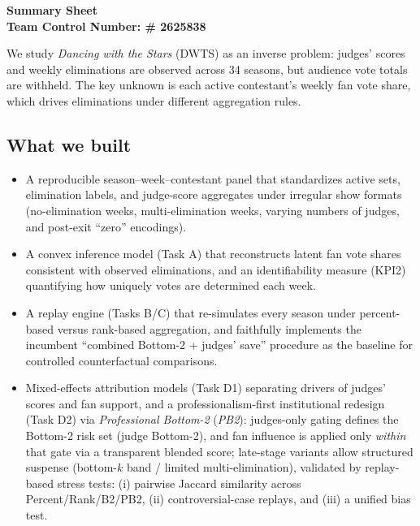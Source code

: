 \begin{center}
  \textbf{\LARGE Summary Sheet}\\[0.35em]
  \textbf{Team Control Number: \# 2625838}
\end{center}

\setlength{\parskip}{-0.5em}
\setlength{\parindent}{0pt}

\small
We study \emph{Dancing with the Stars} (DWTS) as an inverse problem: judges' scores and weekly eliminations are observed
across 34 seasons\cite{comap2026_problemC_data}, but audience vote totals are withheld. The key unknown is each active contestant's weekly fan vote share,
which drives eliminations under different aggregation rules.

\subsection*{What we built}
\begin{itemize}
    \item A reproducible season--week--contestant panel that standardizes active sets, elimination labels, and judge-score aggregates
    under irregular show formats (no-elimination weeks, multi-elimination weeks, varying numbers of judges, and post-exit ``zero'' encodings).
    \item A convex inference model (Task A) that reconstructs latent fan vote shares consistent with observed eliminations, and an identifiability
    measure (KPI2) quantifying how uniquely votes are determined each week.
    \item A replay engine (Tasks B/C) that re-simulates every season under percent-based versus rank-based aggregation, and faithfully implements the incumbent ``combined Bottom-2 + judges' save'' procedure as the baseline for controlled counterfactual comparisons.
    \item Mixed-effects attribution models (Task D1) separating drivers of judges' scores and fan support, and a professionalism-first institutional redesign (Task D2) via \textit{Professional Bottom-2} (\textit{PB2}):
    judges-only gating defines the Bottom-2 risk set (judge Bottom-2), and fan influence is applied only \emph{within} that gate via a transparent blended score; late-stage variants allow structured suspense (bottom-$k$ band / limited multi-elimination),
    validated by replay-based stress tests: (i) pairwise Jaccard similarity across Percent/Rank/B2/PB2, (ii) controversial-case replays, and (iii) a unified bias test.
\end{itemize}

